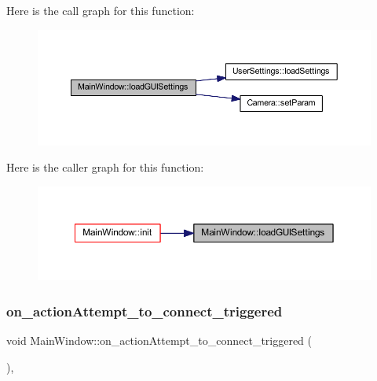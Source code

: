 Here is the call graph for this function\+:
\nopagebreak
\begin{figure}[H]
\begin{center}
\leavevmode
\includegraphics[width=350pt]{classMainWindow_ad0f8d1384a86ac65b996addd300ef620_cgraph}
\end{center}
\end{figure}
Here is the caller graph for this function\+:
\nopagebreak
\begin{figure}[H]
\begin{center}
\leavevmode
\includegraphics[width=350pt]{classMainWindow_ad0f8d1384a86ac65b996addd300ef620_icgraph}
\end{center}
\end{figure}
\mbox{\label{classMainWindow_aea8024d64cc8d8b805b66a45524e753e}} 
\subsubsection{\texorpdfstring{on\_actionAttempt\_to\_connect\_triggered}{on\_actionAttempt\_to\_connect\_triggered}}
{\footnotesize\ttfamily void Main\+Window\+::on\+\_\+action\+Attempt\+\_\+to\+\_\+connect\+\_\+triggered (\begin{DoxyParamCaption}{ }\end{DoxyParamCaption})\hspace{0.3cm}{\ttfamily [private]}, {\ttfamily [slot]}}



